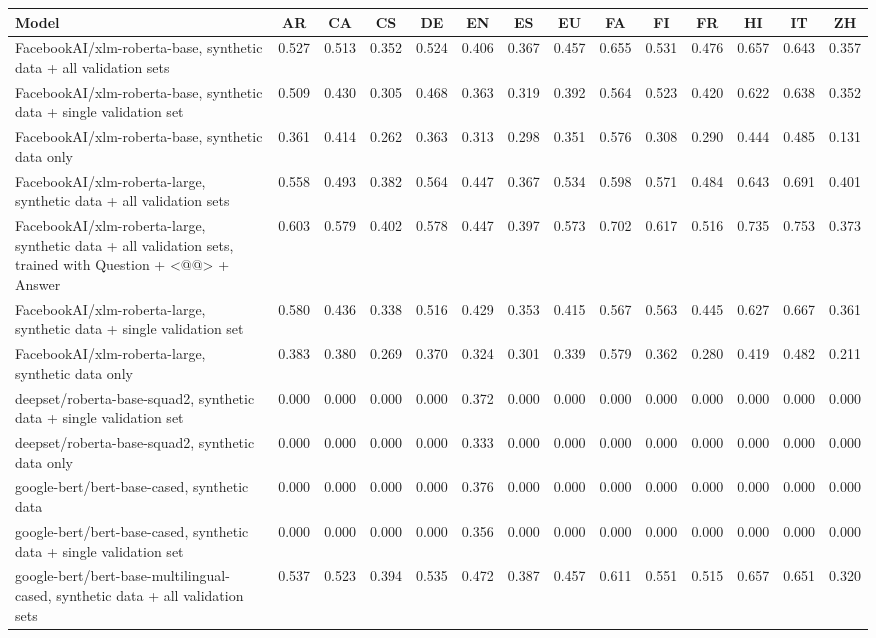 \begin{landscape}
\begin{tabular}{lccccccccccccc}
\hline
Model & AR & CA & CS & DE & EN & ES & EU & FA & FI & FR & HI & IT & ZH \\
\hline
FacebookAI/xlm-roberta-base, synthetic data + all validation sets & 0.527 & 0.513 & 0.352 & 0.524 & 0.406 & 0.367 & 0.457 & 0.655 & 0.531 & 0.476 & 0.657 & 0.643 & 0.357 \\
FacebookAI/xlm-roberta-base, synthetic data + single validation set & 0.509 & 0.430 & 0.305 & 0.468 & 0.363 & 0.319 & 0.392 & 0.564 & 0.523 & 0.420 & 0.622 & 0.638 & 0.352 \\
FacebookAI/xlm-roberta-base, synthetic data only & 0.361 & 0.414 & 0.262 & 0.363 & 0.313 & 0.298 & 0.351 & 0.576 & 0.308 & 0.290 & 0.444 & 0.485 & 0.131 \\
FacebookAI/xlm-roberta-large, synthetic data + all validation sets & 0.558 & 0.493 & 0.382 & 0.564 & 0.447 & 0.367 & 0.534 & 0.598 & 0.571 & 0.484 & 0.643 & 0.691 & 0.401 \\
FacebookAI/xlm-roberta-large, synthetic data + all validation sets, trained with Question + <@@> + Answer & 0.603 & 0.579 & 0.402 & 0.578 & 0.447 & 0.397 & 0.573 & 0.702 & 0.617 & 0.516 & 0.735 & 0.753 & 0.373 \\
FacebookAI/xlm-roberta-large, synthetic data + single validation set & 0.580 & 0.436 & 0.338 & 0.516 & 0.429 & 0.353 & 0.415 & 0.567 & 0.563 & 0.445 & 0.627 & 0.667 & 0.361 \\
FacebookAI/xlm-roberta-large, synthetic data only & 0.383 & 0.380 & 0.269 & 0.370 & 0.324 & 0.301 & 0.339 & 0.579 & 0.362 & 0.280 & 0.419 & 0.482 & 0.211 \\
deepset/roberta-base-squad2, synthetic data + single validation set & 0.000 & 0.000 & 0.000 & 0.000 & 0.372 & 0.000 & 0.000 & 0.000 & 0.000 & 0.000 & 0.000 & 0.000 & 0.000 \\
deepset/roberta-base-squad2, synthetic data only & 0.000 & 0.000 & 0.000 & 0.000 & 0.333 & 0.000 & 0.000 & 0.000 & 0.000 & 0.000 & 0.000 & 0.000 & 0.000 \\
google-bert/bert-base-cased, synthetic data & 0.000 & 0.000 & 0.000 & 0.000 & 0.376 & 0.000 & 0.000 & 0.000 & 0.000 & 0.000 & 0.000 & 0.000 & 0.000 \\
google-bert/bert-base-cased, synthetic data + single validation set & 0.000 & 0.000 & 0.000 & 0.000 & 0.356 & 0.000 & 0.000 & 0.000 & 0.000 & 0.000 & 0.000 & 0.000 & 0.000 \\
google-bert/bert-base-multilingual-cased, synthetic data + all validation sets & 0.537 & 0.523 & 0.394 & 0.535 & 0.472 & 0.387 & 0.457 & 0.611 & 0.551 & 0.515 & 0.657 & 0.651 & 0.320 \\

\end{tabular}
\end{landscape}

